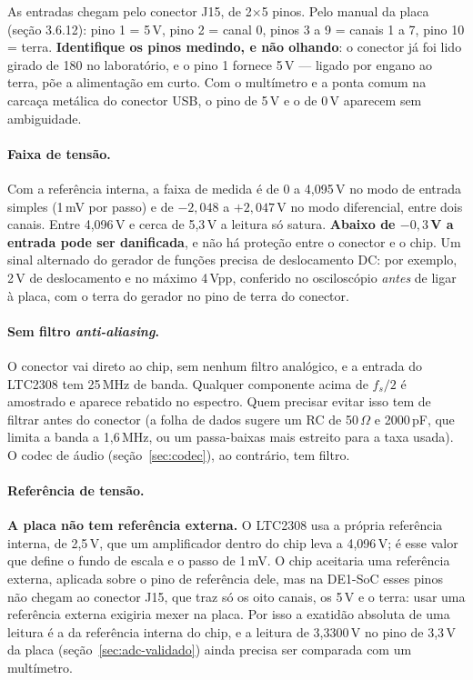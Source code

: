 As entradas chegam pelo conector J15, de 2\(\times\)5 pinos. Pelo manual da
placa (seção 3.6.12): pino 1 = 5\,V, pino 2 = canal 0, pinos 3 a 9 = canais 1 a
7, pino 10 = terra. \textbf{Identifique os pinos medindo, e não olhando}: o
conector já foi lido girado de 180\textdegree{} no laboratório, e o pino 1 fornece 5\,V ---
ligado por engano ao terra, põe a alimentação em curto. Com o multímetro e a
ponta comum na carcaça metálica do conector USB, o pino de 5\,V e o de 0\,V
aparecem sem ambiguidade.

\paragraph{Faixa de tensão.} Com a referência interna, a faixa de medida é de
0 a 4,095\,V no modo de entrada simples (1\,mV por passo) e de
\(-2{,}048\) a \(+2{,}047\)\,V no modo diferencial, entre dois canais. Entre
4,096\,V e cerca de 5,3\,V a leitura só satura. \textbf{Abaixo de
\(-0{,}3\)\,V a entrada pode ser danificada}, e não há proteção entre o
conector e o chip. Um sinal alternado do gerador de funções precisa de
deslocamento DC: por exemplo, 2\,V de deslocamento e no máximo 4\,Vpp, conferido
no osciloscópio \emph{antes} de ligar à placa, com o terra do gerador no pino
de terra do conector.

\paragraph{Sem filtro \emph{anti-aliasing}.} O conector vai direto ao chip, sem
nenhum filtro analógico, e a entrada do LTC2308 tem 25\,MHz de banda. Qualquer
componente acima de \(f_s/2\) é amostrado e aparece rebatido no espectro. Quem
precisar evitar isso tem de filtrar antes do conector (a folha de dados sugere
um RC de 50\,\(\Omega\) e 2000\,pF, que limita a banda a 1,6\,MHz, ou um
passa-baixas mais estreito para a taxa usada). O codec de áudio
(seção~\ref{sec:codec}), ao contrário, tem filtro.

\paragraph{Referência de tensão.} \textbf{A placa não tem referência externa.}
O LTC2308 usa a própria referência interna, de 2,5\,V, que um amplificador
dentro do chip leva a 4,096\,V; é esse valor que define o fundo de escala e o
passo de 1\,mV. O chip aceitaria uma referência externa, aplicada sobre o pino
de referência dele, mas na DE1-SoC esses pinos não chegam ao conector J15, que
traz só os oito canais, os 5\,V e o terra: usar uma referência externa
exigiria mexer na placa. Por isso a exatidão absoluta de uma leitura é a da
referência interna do chip, e a leitura de 3,3300\,V no pino de 3,3\,V da placa
(seção~\ref{sec:adc-validado}) ainda precisa ser comparada com um multímetro.

